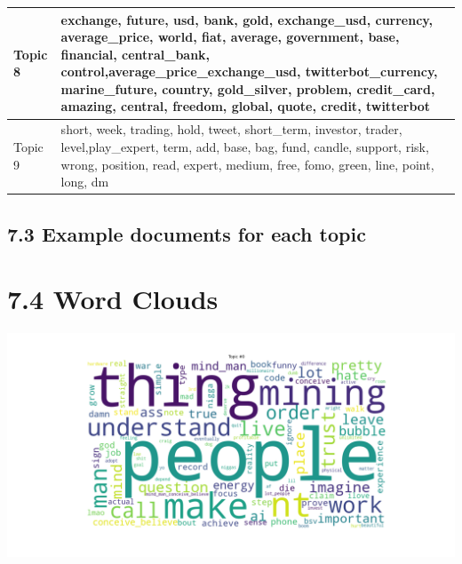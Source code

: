 \documentclass[
]{article}
\begin{document}
\begin{table}
\begin{tabular}[t]{l|l}
\hline
Topic 8 & exchange,                    future,                       usd,                      bank,                      gold,              exchange\_usd,                  currency,             average\_price,                     world,                      fiat,                   average,                government,                      base,                 financial,              central\_bank,                   control,average\_price\_exchange\_usd,       twitterbot\_currency,             marine\_future,                   country,               gold\_silver,                   problem,               credit\_card,                   amazing,                   central,                   freedom,                    global,                     quote,                    credit,                twitterbot\\
\hline
Topic 9 & short,       week,    trading,       hold,      tweet, short\_term,   investor,     trader,      level,play\_expert,       term,        add,       base,        bag,       fund,     candle,    support,       risk,      wrong,   position,       read,     expert,     medium,       free,       fomo,      green,       line,      point,       long,         dm\\
\hline
\end{tabular}
\end{table}

\hypertarget{example-documents-for-each-topic}{%
\subsection{7.3 Example documents for each
topic}\label{example-documents-for-each-topic}}

\hypertarget{word-clouds}{%
\section{7.4 Word Clouds}\label{word-clouds}}

\includegraphics{images/03 - Topic_0.png}
\end{document}
